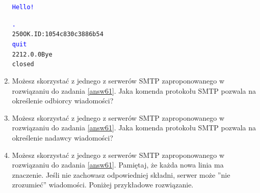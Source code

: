 \begin{enumerate}[label=\textbf{6.\arabic*}]
\begin{alltt}
\textcolor{blue}{Hello!}

\textcolor{blue}{.}
250 OK. ID: 1054c830c3886b54
\textcolor{blue}{quit}
221 2.0.0 Bye
closed
\end{alltt}

\normalsize
\item Możesz skorzystać z jednego z serwerów SMTP zaproponowanego w rozwiązaniu do zadania \ref{answ61}. Jaka komenda protokołu SMTP pozwala na określenie odbiorcy wiadomości? 

\item Możesz skorzystać z jednego z serwerów SMTP zaproponowanego w rozwiązaniu do zadania \ref{answ61}. Jaka komenda protokołu SMTP pozwala na określenie nadawcy wiadomości? 

\item Możesz skorzystać z jednego z serwerów SMTP zaproponowanego w rozwiązaniu do zadania \ref{answ61}. Pamiętaj, że każda nowa linia ma znaczenie. Jeśli nie zachowasz odpowiedniej składni, serwer może ''nie zrozumieć'' wiadomości. Poniżej przykładowe rozwiązanie.  


\end{enumerate}
